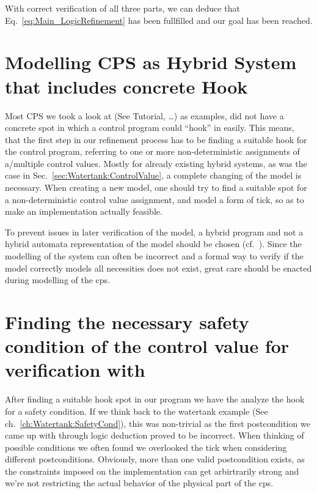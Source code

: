 With correct verification of all three parts, we can deduce that Eq.~\ref{eq:Main_LogicRefinement} has been fullfilled and our goal has been reached.

\section{Modelling CPS as Hybrid System that includes concrete Hook}
\label{sec:Process:Hook}
Most CPS we took a look at (See \cite{keymaera} Tutorial, \cite[p.~5, p.~11]{platzer2010b} \dots) as examples, did not have a concrete spot in which a control program could ``hook'' in easily. This means, that the first step in our refinement process has to be finding a suitable hook for the control program, referring to one or more non-deterministic assignments of a/multiple control values. Mostly for already existing hybrid systems, as was the case in Sec.~\ref{sec:Watertank:ControlValue}, a complete changing of the model is necessary. When creating a new model, one should try to find a suitable spot for a non-deterministic control value assignment, and model a form of tick, so as to make an implementation actually feasible.

To prevent issues in later verification of the model, a hybrid program and not a hybrid automata representation of the model should be chosen (cf.~\cite[ch.~1.1.4]{platzer2010b}). Since the modelling of the system can often be incorrect and a formal way to verify if the model correctly models all necessities does not exist, great care should be enacted during modelling of the cps.

\section{Finding the necessary safety condition of the control value for verification with \keym}
\label{sec:Process:SafetyCond}

After finding a suitable hook spot in our program we have the analyze the hook for a safety condition. If we think back to the watertank example (See ch.~\ref{ch:Watertank:SafetyCond}), this was non-trivial as the first postcondition we came up with through logic deduction proved to be incorrect. When thinking of possible conditions we often found we overlooked the tick when considering different postconditions. Obviously, more than one valid postcondition exists, as the constraints imposed on the implementation can get arbirtrarily strong and we're not restricting the actual behavior of the physical part of the cps. 


